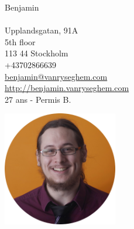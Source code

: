 \documentclass{curve}
\title{}
\begin{document}
\begin{minipage}{7cm}
\large
Benjamin \\
\normalsize
\\
Upplandsgatan, 91A\\
5th floor\\
113 44 Stockholm\\
+43702866639\\
\href{mailto:benjamin@vanryseghem.com}{benjamin@vanryseghem.com}\\
\href{http://benjamin.vanryseghem.com}{\underline{http://benjamin.vanryseghem.com}}\\
27 ans - Permis B.
\end{minipage}
\hfill
\begin{minipage}{7cm}
  \begin{flushright}
  \includegraphics[height=5cm]{Moi}
  \end{flushright}
\end{minipage}
\maketitle
\vspace{-1cm}

\end{document}
